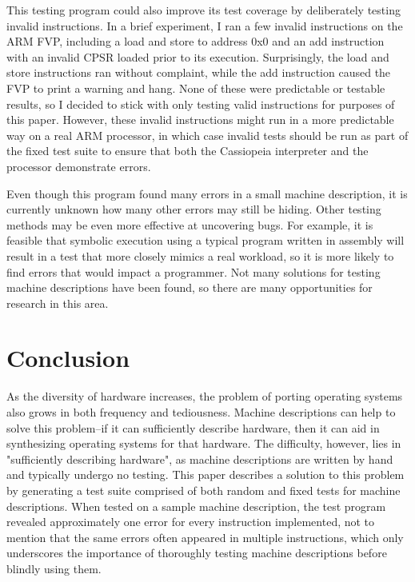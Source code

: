 \documentclass[letterpaper,12pt]{article}
\begin{document}
This testing program could also improve its test coverage by deliberately testing invalid instructions. In a brief experiment, I ran a few invalid instructions on the ARM FVP, including a load and store to address 0x0 and an add instruction with an invalid CPSR loaded prior to its execution. Surprisingly, the load and store instructions ran without complaint, while the add instruction caused the FVP to print a warning and hang. None of these were predictable or testable results, so I decided to stick with only testing valid instructions for purposes of this paper. However, these invalid instructions might run in a more predictable way on a real ARM processor, in which case invalid tests should be run as part of the fixed test suite to ensure that both the Cassiopeia interpreter and the processor demonstrate errors.

Even though this program found many errors in a small machine description, it is currently unknown how many other errors may still be hiding. Other testing methods may be even more effective at uncovering bugs. For example, it is feasible that symbolic execution using a typical program written in assembly will result in a test that more closely mimics a real workload, so it is more likely to find errors that would impact a programmer. Not many solutions for testing machine descriptions have been found, so there are many opportunities for research in this area.

\section{Conclusion}

As the diversity of hardware increases, the problem of porting operating systems also grows in both frequency and tediousness. Machine descriptions can help to solve this problem--if it can sufficiently describe hardware, then it can aid in synthesizing operating systems for that hardware. The difficulty, however, lies in "sufficiently describing hardware", as machine descriptions are written by hand and typically undergo no testing. This paper describes a solution to this problem by generating a test suite comprised of both random and fixed tests for machine descriptions. When tested on a sample machine description, the test program revealed approximately one error for every instruction implemented, not to mention that the same errors often appeared in multiple instructions, which only underscores the importance of thoroughly testing machine descriptions before blindly using them.
\end{document}
